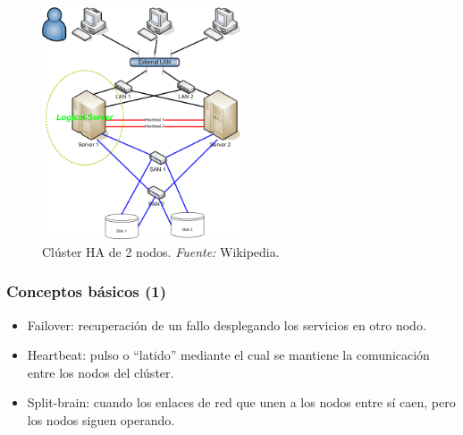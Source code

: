 \documentclass{beamer}
\begin{document}

\begin{frame}

\begin{figure}[h]

\begin{center}
  \centering
  \includegraphics[height=2.7in]{figs/2nodeHAcluster.png}
  \caption{Clúster HA de 2 nodos. \textit{Fuente:} Wikipedia.}
\end{center}
\end{figure}

\end{frame}



\begin{frame}
\frametitle{Conceptos básicos (1)}

\begin{itemize}
\item \alert{Failover}: recuperación de un fallo desplegando los servicios en otro nodo.
\item \alert{Heartbeat}: pulso o ``latido'' mediante el cual se mantiene la comunicación entre los nodos del clúster. 
\item \alert{Split-brain}: cuando los enlaces de red que unen a los nodos entre sí caen, pero los nodos siguen operando. 
\end{itemize}

\end{frame}

\end{document}
